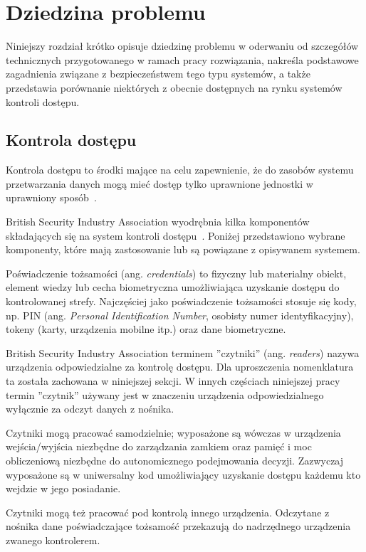 \chapter{Dziedzina problemu}
\label{chap:problem-domain}

	Niniejszy rozdział krótko opisuje dziedzinę problemu w oderwaniu od szczegółów technicznych przygotowanego w ramach pracy rozwiązania, nakreśla podstawowe zagadnienia związane z bezpieczeństwem tego typu systemów, a także przedstawia porównanie niektórych z obecnie dostępnych na rynku systemów kontroli dostępu.

	\section{Kontrola dostępu}

		Kontrola dostępu to środki mające na celu zapewnienie, że do zasobów systemu przetwarzania danych mogą mieć dostęp tylko uprawnione jednostki w uprawniony sposób~\cite{pkn2002}.

		British Security Industry Association wyodrębnia kilka komponentów składających się na system kontroli dostępu~\cite{bsia2016}. Poniżej przedstawiono wybrane komponenty, które mają zastosowanie lub są powiązane z opisywanem systemem.

		Poświadczenie tożsamości (ang. \textit{credentials}) to fizyczny lub materialny obiekt, element wiedzy lub cecha biometryczna umożliwiająca uzyskanie dostępu do kontrolowanej strefy. Najczęściej jako poświadczenie tożsamości stosuje się kody, np. PIN (ang. \textit{Personal Identification Number}, osobisty numer identyfikacyjny), tokeny (karty, urządzenia mobilne itp.) oraz dane biometryczne.

		British Security Industry Association terminem ''czytniki'' (ang. \textit{readers}) nazywa urządzenia odpowiedzialne za kontrolę dostępu. Dla uproszczenia nomenklatura ta została zachowana w niniejszej sekcji. W innych częściach niniejszej pracy termin ''czytnik'' używany jest w znaczeniu urządzenia odpowiedzialnego wyłącznie za odczyt danych z nośnika.

		Czytniki mogą pracować samodzielnie; wyposażone są wówczas w urządzenia wejścia/wyjścia niezbędne do zarządzania zamkiem oraz pamięć i moc obliczeniową niezbędne do autonomicznego podejmowania decyzji. Zazwyczaj wyposażone są w uniwersalny kod umożliwiający uzyskanie dostępu każdemu kto wejdzie w jego posiadanie.

		Czytniki mogą też pracować pod kontrolą innego urządzenia. Odczytane z nośnika dane poświadczające tożsamość przekazują do nadrzędnego urządzenia zwanego kontrolerem.

